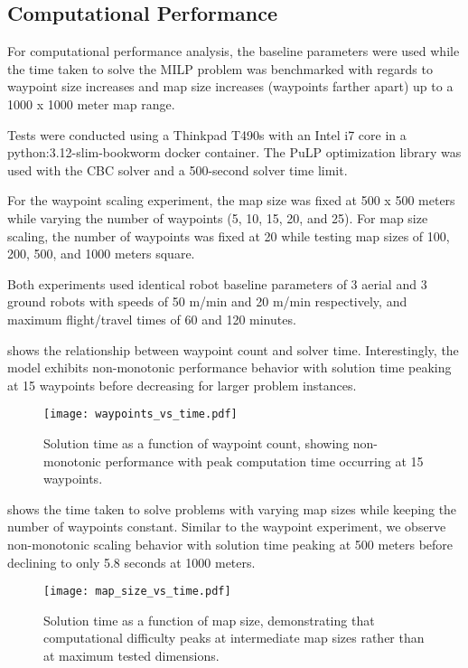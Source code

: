 \documentclass{article}
\begin{document}
	\subsection{Computational Performance}

	For computational performance analysis, the baseline parameters were used while the time taken to solve the MILP problem was benchmarked with regards to waypoint size increases and map size increases (waypoints farther apart) up to a 1000 x 1000 meter map range. 

	Tests were conducted using a Thinkpad T490s with an Intel i7 core in a python:3.12-slim-bookworm docker container.
	The PuLP optimization library was used with the CBC solver and a 500-second solver time limit.

	For the waypoint scaling experiment, the map size was fixed at 500 x 500 meters while varying the number of waypoints (5, 10, 15, 20, and 25). 
	For map size scaling, the number of waypoints was fixed at 20 while testing map sizes of 100, 200, 500, and 1000 meters square. 
	
	Both experiments used identical robot baseline parameters of 3 aerial and 3 ground robots with speeds of 50 m/min and 20 m/min respectively, and maximum flight/travel times of 60 and 120 minutes.

	 shows the relationship between waypoint count and solver time. 
	Interestingly, the model exhibits non-monotonic performance behavior with solution time peaking at 15 waypoints before decreasing for larger problem instances.

	\begin{figure}[htbp]
			\centering
			\texttt{[image: waypoints\_vs\_time.pdf]}
			\caption{Solution time as a function of waypoint count, showing non-monotonic performance with peak computation time occurring at 15 waypoints.}
			\label{fig:waypoint_time}
	\end{figure}

	 shows the time taken to solve problems with varying map sizes while keeping the number of waypoints constant. 
	Similar to the waypoint experiment, we observe non-monotonic scaling behavior with solution time peaking at 500 meters before declining to only 5.8 seconds at 1000 meters. 

	\begin{figure}[htbp]
			\centering
			\texttt{[image: map\_size\_vs\_time.pdf]}
			\caption{Solution time as a function of map size, demonstrating that computational difficulty peaks at intermediate map sizes rather than at maximum tested dimensions.}
			\label{fig:map_time}
	\end{figure}
\end{document}
